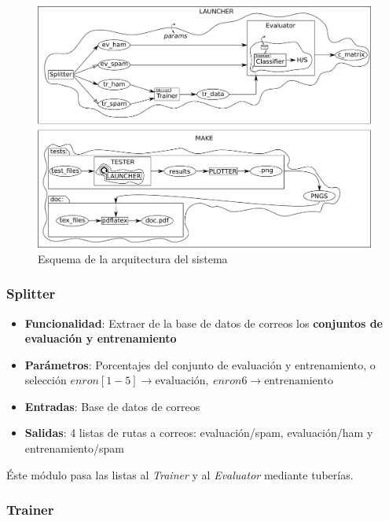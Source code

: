 \begin{landscape}
\begin{figure}[p]
	\centering
	\includegraphics[width=\paperwidth, height=\paperheight, keepaspectratio]{img/esquema}
	\caption{Esquema de la arquitectura del sistema}
	\label{fig:esquema}
\end{figure}
\end{landscape}

\subsubsection{Splitter}

\begin{itemize}
	\item \textbf{Funcionalidad}: Extraer de la base de datos de correos los
		\textbf{conjuntos de evaluación y entrenamiento}
	\item \textbf{Parámetros}: Porcentajes del conjunto de evaluación y
		entrenamiento, o selección $enron[1-5] \rightarrow
		\text{evaluación},\ enron6 \rightarrow \text{entrenamiento}$
	\item \textbf{Entradas}: Base de datos de correos
	\item \textbf{Salidas}: 4 listas de rutas a correos: evaluación/spam,
		evaluación/ham y entrenamiento/spam
\end{itemize}

Éste módulo pasa las listas al \textit{Trainer} y al \textit{Evaluator} mediante
tuberías.

\subsubsection{Trainer}

